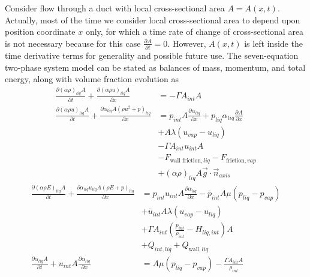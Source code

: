 Consider flow through a duct with local cross-sectional area
$A=A(x,t)$.  Actually, most of the time we consider local
cross-sectional area to depend upon position coordinate $x$ only,
for which a time rate of change of cross-sectional area is not
necessary because for this case $\frac{\partial A}{\partial
t} = 0$.  However, $A(x,t)$ is left inside the time derivative terms
for generality and possible future use.  The seven-equation two-phase
system model can be stated as balances of mass, momentum, and total energy,
along with volume fraction evolution as
\begin{align}
  \label{E-R:74}
  \frac{\partial \left( \alpha \rho \right)_{liq} A}{\partial t}
  + \frac{\partial \left( \alpha \rho u \right)_{liq} A}{\partial x}
  &= - \Gamma A_{int} A
  \\
  \nonumber
  \frac{\partial \left( \alpha \rho u \right)_{liq} A}{\partial t}
  + \frac{\partial \alpha_{liq} A \left( \rho u^2 + p \right)_{liq} }{\partial x}
  &= p_{int} A \frac{\partial \alpha_{liq}}{\partial x} + p_{liq} \alpha_{liq} \frac{\partial A}{\partial x}
  \\
  \nonumber
  &+ A \lambda (u_{vap} - u_{liq})
  \\
  \nonumber
  &- \Gamma A_{int} u_{int} A
  \\
  \nonumber
  &- F_{\text{wall friction}, liq} - F_{\text{friction}, vap}
  \\
  &+ \left( \alpha \rho \right)_{liq} A \vec{g} \cdot \vec{n}_{axis}
\end{align}
\begin{align}
  \nonumber
  \frac{\partial \left( \alpha \rho E \right)_{liq} A}{\partial t}
  + \frac{\partial \alpha_{liq} u_{liq} A \left( \rho E + p \right)_{liq}}{\partial x}
  &= p_{int} u_{int} A \frac{\partial \alpha_{liq}}{\partial x} - \bar{p}_{int} A \mu (p_{liq} - p_{vap})
  \\
  \nonumber
  &+ \bar{u}_{int} A \lambda (u_{vap} - u_{liq})
  \\
  \nonumber
  &+ \Gamma A_{int} \left( \frac{p_{int}}{\rho_{int}} - H_{liq, int} \right) A
  \\
  &+ Q_{int, liq} + Q_{\text{wall}, liq}
  \\
  \label{eqn:7eqn_va_alpha_liq}
  \frac{\partial \alpha_{liq} A}{\partial t} + u_{int} A \frac{\partial \alpha_{liq}}{\partial x}
  &= A \mu (p_{liq} - p_{vap}) - \frac{\Gamma A_{int} A}{\rho_{int}}
\end{align}
